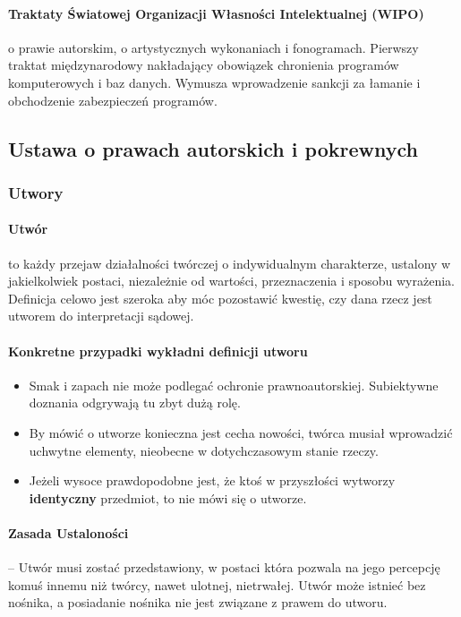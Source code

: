 \documentclass{article}
\begin{document}
\paragraph{Traktaty Światowej Organizacji Własności Intelektualnej (WIPO)}
o prawie autorskim, o artystycznych wykonaniach i fonogramach.
Pierwszy traktat międzynarodowy nakładający obowiązek chronienia programów komputerowych i baz danych.
Wymusza wprowadzenie sankcji za łamanie i obchodzenie zabezpieczeń programów.

\subsection{Ustawa o prawach autorskich i pokrewnych}

\subsubsection{Utwory}

\paragraph{Utwór} to każdy przejaw działalności twórczej o indywidualnym charakterze, ustalony w jakielkolwiek postaci,
niezależnie od wartości, przeznaczenia i sposobu wyrażenia.
Definicja celowo jest szeroka aby móc pozostawić kwestię, czy dana rzecz jest utworem do interpretacji sądowej.

\paragraph{Konkretne przypadki wykładni definicji utworu}
\begin{itemize}
  \item Smak i zapach nie może podlegać ochronie prawnoautorskiej. Subiektywne doznania odgrywają tu zbyt dużą rolę.
  \item By mówić o utworze konieczna jest cecha nowości, twórca musiał wprowadzić uchwytne elementy, nieobecne w dotychczasowym stanie rzeczy.
  \item Jeżeli wysoce prawdopodobne jest, że ktoś w przyszłości wytworzy \textbf{identyczny} przedmiot, to nie mówi się o utworze.
\end{itemize}

\paragraph{Zasada Ustaloności}
-- Utwór musi zostać przedstawiony, w postaci która pozwala na jego percepcję komuś innemu niż twórcy, nawet ulotnej, nietrwałej.
Utwór może istnieć bez nośnika, a posiadanie nośnika nie jest związane z prawem do utworu.
\end{document}
